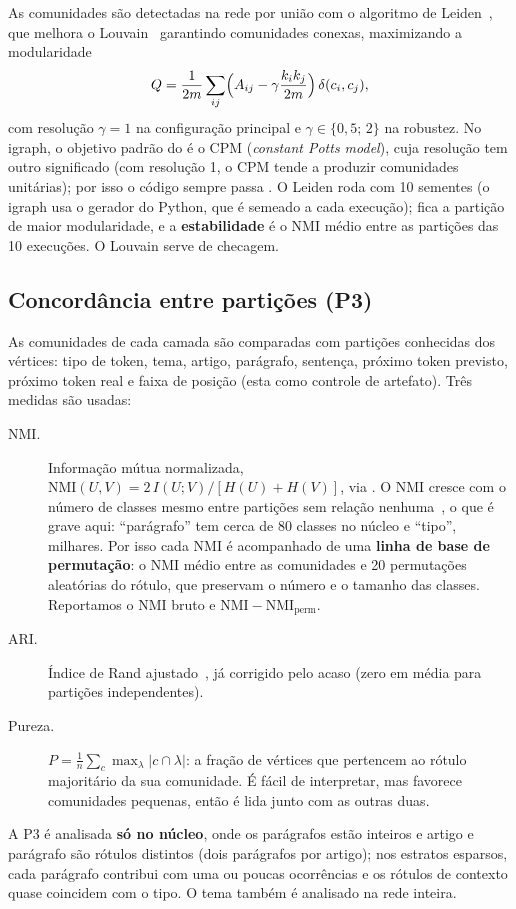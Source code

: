 As comunidades são detectadas na rede por união com o algoritmo de
Leiden~\cite{traag2019}, que melhora o Louvain~\cite{blondel2008} garantindo comunidades
conexas, maximizando a modularidade~\cite{newman2006}
\begin{equation}
    Q=\frac1{2m}\sum_{ij}\Bigl(A_{ij}-\gamma\frac{k_ik_j}{2m}\Bigr)\,\delta(c_i,c_j),
\end{equation}
com resolução $\gamma=1$ na configuração principal e $\gamma\in\{0{,}5;\,2\}$ na robustez. No
igraph, o objetivo padrão do  é o CPM (\emph{constant Potts model}),
cuja resolução tem outro significado (com resolução 1, o CPM tende a produzir comunidades
unitárias); por isso o código sempre passa . O Leiden roda
com 10 sementes (o igraph usa o gerador  do Python, que é semeado a cada execução);
fica a partição de maior modularidade, e a \textbf{estabilidade} é o NMI médio entre as
partições das 10 execuções. O Louvain serve de checagem.

\subsection{Concordância entre partições (P3)}\label{sec:met-concordancia}

As comunidades de cada camada são comparadas com partições conhecidas dos vértices: tipo de
token, tema, artigo, parágrafo, sentença, próximo token previsto, próximo token real e faixa de
posição (esta como controle de artefato). Três medidas são usadas:
\begin{description}
    \item[NMI.] Informação mútua normalizada, $\mathrm{NMI}(U,V)=2\,I(U;V)/[H(U)+H(V)]$, via
    . O NMI cresce com o número de classes mesmo entre
    partições sem relação nenhuma~\cite{vinh2010}, o que é grave aqui: ``parágrafo'' tem cerca
    de 80 classes no núcleo e ``tipo'', milhares. Por isso cada NMI é acompanhado de uma
    \textbf{linha de base de permutação}: o NMI médio entre as comunidades e 20 permutações
    aleatórias do rótulo, que preservam o número e o tamanho das classes. Reportamos o NMI
    bruto e $\mathrm{NMI}-\mathrm{NMI}_{\mathrm{perm}}$.
    \item[ARI.] Índice de Rand ajustado~\cite{hubert1985}, já corrigido pelo acaso (zero em
    média para partições independentes).
    \item[Pureza.] $P=\frac1n\sum_c\max_\lambda |c\cap\lambda|$: a fração de vértices que
    pertencem ao rótulo majoritário da sua comunidade. É fácil de interpretar, mas favorece
    comunidades pequenas, então é lida junto com as outras duas.
\end{description}
A P3 é analisada \textbf{só no núcleo}, onde os parágrafos estão inteiros e artigo e parágrafo
são rótulos distintos (dois parágrafos por artigo); nos estratos esparsos, cada parágrafo
contribui com uma ou poucas ocorrências e os rótulos de contexto quase coincidem com o tipo. O
tema também é analisado na rede inteira.


